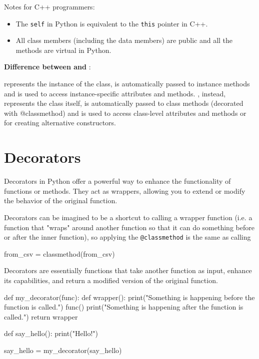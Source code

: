 \begin{observationblock}
    Notes for C++ programmers:
    \begin{itemize}
        \item The \texttt{self} in Python is equivalent to the \texttt{this} pointer in C++.
        \item All class members (including the data members) are public and all the methods are virtual in Python.
    \end{itemize}

    \textbf{Difference between  and }:

     represents the instance of the class, is automatically passed to instance methods 
    and is used to access instance-specific attributes and methods. , instead, 
    represents the class itself, is automatically passed to class methods (decorated with @classmethod) 
    and is used to access class-level attributes and methods or for creating alternative constructors. 
\end{observationblock}


\section{Decorators}

Decorators in Python offer a powerful way to enhance the functionality of functions or methods.
They act as wrappers, allowing you to extend or modify the behavior of the original function.

Decorators can be imagined to be a shortcut to calling a wrapper function (i.e. a function that
"wraps" around another function so that it can do something before or after the inner function), so
applying the \texttt{@classmethod} is the same as calling 
\begin{codeblock}[language=Python]
    from_csv = classmethod(from_csv)
\end{codeblock}

\begin{definitionblock}
    Decorators are essentially functions that take another function as input, enhance its capabilities,
    and return a modified version of the original function.
\end{definitionblock}

\begin{codeblock}[language=Python]
def my_decorator(func):
    def wrapper():
        print("Something is happening before the function is called.")
        func()
        print("Something is happening after the function is called.")
    return wrapper

def say_hello():
    print("Hello!")

say_hello = my_decorator(say_hello)
\end{codeblock}

